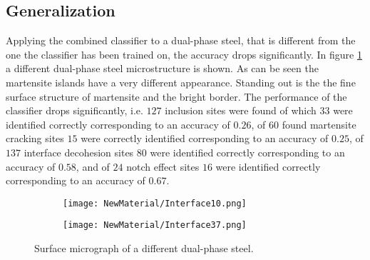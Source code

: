 \subsection{Generalization}

Applying the combined classifier to a dual-phase steel, that is different from the one the classifier has been trained on, the accuracy drops significantly. In figure \ref{fig:newMaterial} a different dual-phase steel microstructure is shown. As can be seen the martensite islands have a very different appearance. Standing out is the the fine surface structure of martensite and the bright border. The performance of the classifier drops significantly, i.e. $127$ inclusion sites were found of which $33$ were identified correctly corresponding to an accuracy of $0.26$, of $60$ found martensite cracking sites $15$ were correctly identified corresponding to an accuracy of $0.25$, of $137$ interface decohesion sites $80$ were identified correctly corresponding to an accuracy of $0.58$, and of $24$ notch effect sites $16$ were identified correctly corresponding to an accuracy of $0.67$. \\

\begin{figure}
\centering
\begin{subfigure}{0.48\textwidth}
\texttt{[image: NewMaterial/Interface10.png]}
\end{subfigure}
\centering
\begin{subfigure}{0.48\textwidth}
\texttt{[image: NewMaterial/Interface37.png]}
\end{subfigure}
\caption{Surface micrograph of a different dual-phase steel.}
\label{fig:newMaterial}
\end{figure}


